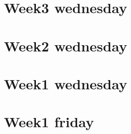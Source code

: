 
\section*{Week3 wednesday}

\vfill
\section*{Week2 wednesday}

\vfill
\section*{Week1 wednesday}

\vfill
\section*{Week1 friday}

\vfill
